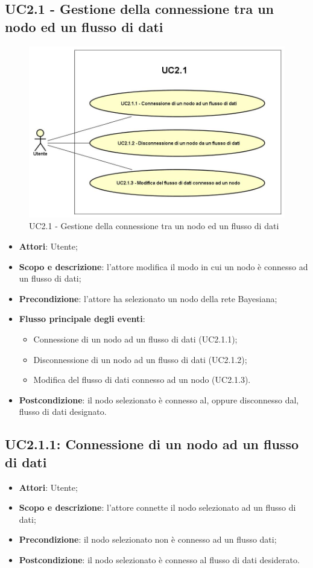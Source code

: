 \subsection{UC2.1 - Gestione della connessione tra un nodo ed un flusso di dati}
\hypertarget{UC2.1}{}
\begin{figure} [H]
	\centering
	\includegraphics[scale=0.45]{Img/UC2-1}
	\caption{UC2.1 - Gestione della connessione tra un nodo ed un flusso di dati}\label{}
\end{figure}
\begin{itemize}
	\item \textbf{Attori}: Utente;
	\item \textbf{Scopo e descrizione}: l'attore modifica il modo in cui un nodo è connesso ad un flusso di dati;
	\item \textbf{Precondizione}: l'attore ha selezionato un nodo della rete Bayesiana;
	\item \textbf{Flusso principale degli eventi}:
	\begin{itemize}
		\item Connessione di un nodo ad un flusso di dati (UC2.1.1);
		\item Disconnessione di un nodo ad un flusso di dati (UC2.1.2);
		\item Modifica del flusso di dati connesso ad un nodo (UC2.1.3).
	\end{itemize}
	\item \textbf{Postcondizione}: il nodo selezionato è connesso al, oppure disconnesso dal, flusso di dati designato.
\end{itemize}

\subsection{UC2.1.1: Connessione di un nodo ad un flusso di dati}
\hypertarget{UC2.1.1}{}
\begin{itemize}
	\item \textbf{Attori}: Utente;
	\item \textbf{Scopo e descrizione}: l'attore connette il nodo selezionato ad un flusso di dati;
	\item \textbf{Precondizione}: il nodo selezionato non è connesso ad un flusso dati;
	\item \textbf{Postcondizione}: il nodo selezionato è connesso al flusso di dati desiderato.
\end{itemize}

